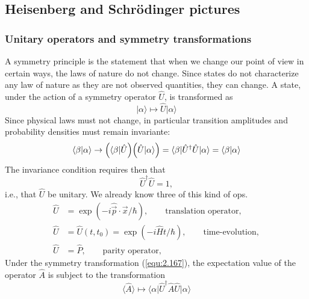 \subsection{Heisenberg and Schrödinger pictures}
\subsubsection{Unitary operators and symmetry
transformations}
A symmetry principle is the statement that when we change
our point of view in certain ways, the laws of nature do not
change. Since states do not characterize any law of nature
as they are not observed quantities, they can change.
A state, under the action of a symmetry operator $\hat{U}$,
is transformed as
\begin{equation}
  \vert \alpha \rangle \mapsto \hat{U}\vert \alpha \rangle
  \label{equ:2.167}
\end{equation}
Since physical laws must not change, in particular
transition amplitudes and probability densities must remain
invariante:
\begin{equation}
  \langle \beta \vert \alpha \rangle \to  \Bigl(\langle
  \beta\vert \hat{U}\Bigr)
  \Bigl(
  \hat{U}\vert \alpha \rangle
  \Bigr)
  = \langle \beta \vert \hat{U}^{\dagger} \hat{U} \vert
  \alpha \rangle = \langle \beta \vert \alpha \rangle
  \label{equ:2.168}
\end{equation}
The invariance condition requires then that
\begin{equation}
  \hat{U}^{\dagger}\hat{U} = 1,
  \label{equ:2.169}
\end{equation}
i.e., that $\hat{U}$ be unitary. We already know three of
this kind of ops.
\begin{subequations}
  \begin{alignat}{2}
    \hat{U} &= \exp(-i\hat{\vec{p}}\cdot \vec{x}/\hbar),
    \qquad \text{translation operator,} \label{equ:2.170a}\\
    \hat{U} &= \hat{U}(t,t_0) = \exp(-i \hat{H}t /\hbar),
    \qquad \text{time-evolution},\label{equ:2.170b}\\
    \hat{U} &= \hat{P}, \qquad \text{parity operator},
    \label{equ:2.170c}
  \end{alignat}
\end{subequations}
Under the symmetry transformation (\ref{equ:2.167}), the
expectation value of the operator $\hat{A}$ is subject to
the transformation
\begin{equation}
  \langle \hat{A} \rangle \mapsto \langle \alpha \vert
  \hat{U}^{\dagger} \hat{A} \hat{U} \vert \alpha \rangle
  \label{equ:2.171}
\end{equation}
